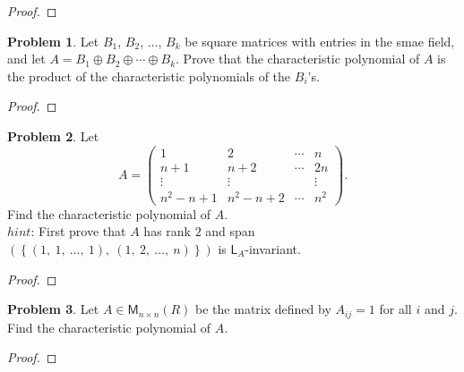 \documentclass[12pt]{book}
\theoremstyle{definition}
\newtheorem{problem}{Problem}
\begin{document}
	\begin{proof}
	\end{proof}
	\newpage
	\begin{problem}
		Let $B_1$, $B_2$, $\ldots$, $B_k$ be square matrices with entries in the smae field, and let $A=B_1\oplus B_2\oplus\cdots\oplus B_k$. Prove that the characteristic polynomial of $A$ is the product of the characteristic polynomials of the $B_i$'s.
	\end{problem}
	\begin{proof}
	\end{proof}
	\newpage
	\begin{problem}
		Let
		\begin{equation*}
			A=\begin{pmatrix}
				1&2&\cdots&n\\
				n+1&n+2&\cdots&2n\\
				\vdots&\vdots&&\vdots\\
				n^2-n+1&n^2-n+2&\cdots&n^2
			\end{pmatrix}.
		\end{equation*}
		Find the characteristic polynomial of $A$.\\
		$hint$: First prove that $A$ has rank $2$ and span$\left(\left\{(1,~1,~\ldots,~1),~(1,~2,~\ldots,~n)\right\}\right)$ is $\mathsf{L}_A$-invariant.
	\end{problem}
	\begin{proof}
	\end{proof}
	\newpage
	\begin{problem}
		Let $A\in\mathsf{M}_{n\times n}(R)$ be the matrix defined by $A_{ij}=1$ for all $i$ and $j$. Find the characteristic polynomial of $A$.
	\end{problem}
	\begin{proof}
	\end{proof}
\end{document}
